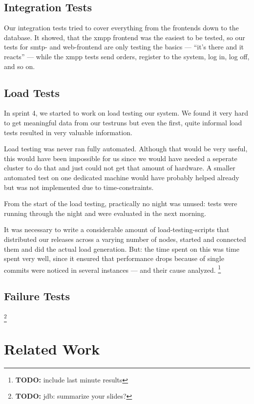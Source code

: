 \documentclass[11pt,a4paper]{report}
\newcommand{\hi}[1]{{\color{red}\em #1\/}\\}
\newcommand{\todo}[1]{\footnote{{\color{red} {\bf TODO:} #1}}}
\begin{document}
\section{Integration Tests}
Our integration tests tried to cover everything from the frontends down to the
database. It showed, that the xmpp frontend was the easiest to be tested, so
our tests for smtp- and web-frontend are only testing the basics --- ``it's
there and it reacts'' --- while the xmpp tests send orders, register to the 
system, log in, log off, and so on.

\section{Load Tests}
In sprint 4, we started to work on load testing our system. We found it very
hard to get meaningful data from our testruns but even the first, quite informal
load tests resulted in very valuable information.

Load testing was never ran fully automated. Although that would be very useful, 
this would have been impossible for us since we would have needed a seperate
cluster to do that and just could not get that amount of hardware.
A smaller automated test on one dedicated machine would have probably helped
already but was not implemented due to time-constraints.

From the start of the load testing, practically no night was unused: tests were
running through the night and were evaluated in the next morning.

It was necessary to write a considerable amount of load-testing-scripts that
distributed our releases across a varying number of nodes, started and connected
them and did the actual load generation. But: the time spent on this was time
spent very well, since it ensured that performance drops because of single
commits were noticed in several instances --- and their cause analyzed.
\todo{include last minute results}
\section{Failure Tests}
\todo{jdb: summarize your slides?}

\chapter{Related Work}
\end{document}
